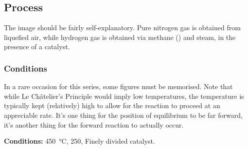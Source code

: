 

		\pagebreak
		\subsection{Process}


			The image should be fairly self-explanatory. Pure nitrogen gas is obtained from liquefied air, while hydrogen gas is obtained
			via methane () and steam, in the presence of a catalyst.

			\subsubsection{Conditions}

				In a rare occasion for this series, some figures must be memorised. Note that while Le Châtelier's Principle would imply
				low temperatures, the temperature is typically kept (relatively) high to allow for the reaction to proceed at an appreciable
				rate. It's one thing for the position of equilibrium to be far forward, it's another thing for the forward reaction to
				actually occur.

				\vspace{1.5em}
				\parbox{\textwidth}{
					\textbf{Conditions:}\tabto{35mm}    \SI{450}{\celsius}, \SI{250}{\atm}, Finely divided  catalyst.
				}




















